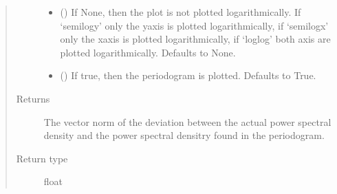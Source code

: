 \documentclass[letterpaper,10pt,english]{sphinxmanual}
\begin{document}
\begin{fulllineitems}
\begin{fulllineitems}
\begin{quote}
\begin{description}
\begin{itemize}
\item {} 
 (\sphinxstyleliteralemphasis{\sphinxupquote{, }}\sphinxstyleliteralemphasis{\sphinxupquote{, }}\sphinxstyleliteralemphasis{\sphinxupquote{, }}\sphinxstyleliteralemphasis{\sphinxupquote{, }}) \textendash{} If None, then the plot is not plotted logarithmically. If
‘semilogy’ only the y\sphinxhyphen{}axis is plotted logarithmically, if
‘semilogx’ only the x\sphinxhyphen{}axis is plotted logarithmically, if ‘loglog’
both axis are plotted logarithmically. Defaults to None.

\item {} 
 (\sphinxstyleliteralemphasis{\sphinxupquote{, }}) \textendash{} If true, then the periodogram is plotted. Defaults to True.

\end{itemize}

\item[{Returns}] \leavevmode
{} \textendash{} The vector norm of the deviation between the actual power spectral
density and the power spectral densitry found in the periodogram.

\item[{Return type}] \leavevmode
float

\end{description}\end{quote}

\end{fulllineitems}


\end{fulllineitems}

\end{document}
